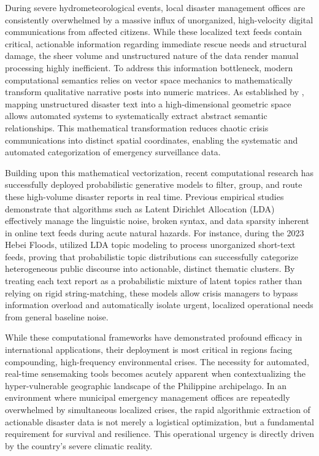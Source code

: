\documentclass[12pt,a4paper]{report}
\begin{document}
During severe hydrometeorological events, local disaster management offices
are consistently overwhelmed by a massive influx of unorganized, high-velocity
digital communications from affected citizens. While these localized text
feeds contain critical, actionable information regarding immediate rescue
needs and structural damage, the sheer volume and unstructured nature of the
data render manual processing highly inefficient. To address this information
bottleneck, modern computational semantics relies on vector space mechanics to
mathematically transform qualitative narrative posts into numeric matrices. As
established by \parencite{mihunov2022}, mapping unstructured disaster text into a
high-dimensional geometric space allows automated systems to systematically
extract abstract semantic relationships. This mathematical transformation
reduces chaotic crisis communications into distinct spatial coordinates,
enabling the systematic and automated categorization of emergency surveillance
data.

Building upon this mathematical vectorization, recent computational research
has successfully deployed probabilistic generative models to filter, group,
and route these high-volume disaster reports in real time. Previous empirical
studies demonstrate that algorithms such as Latent Dirichlet Allocation (LDA)
effectively manage the linguistic noise, broken syntax, and data sparsity
inherent in online text feeds during acute natural hazards. For instance,
during the 2023 Hebei Floods, \parencite{zang2026} utilized LDA topic modeling to
process unorganized short-text feeds, proving that probabilistic topic
distributions can successfully categorize heterogeneous public discourse into
actionable, distinct thematic clusters. By treating each text report as a
probabilistic mixture of latent topics rather than relying on rigid
string-matching, these models allow crisis managers to bypass information
overload and automatically isolate urgent, localized operational needs from
general baseline noise.

While these computational frameworks have demonstrated profound efficacy in
international applications, their deployment is most critical in regions
facing compounding, high-frequency environmental crises. The necessity for
automated, real-time sensemaking tools becomes acutely apparent when
contextualizing the hyper-vulnerable geographic landscape of the Philippine
archipelago. In an environment where municipal emergency management offices
are repeatedly overwhelmed by simultaneous localized crises, the rapid
algorithmic extraction of actionable disaster data is not merely a logistical
optimization, but a fundamental requirement for survival and resilience. This
operational urgency is directly driven by the country's severe climatic
reality.
\end{document}

